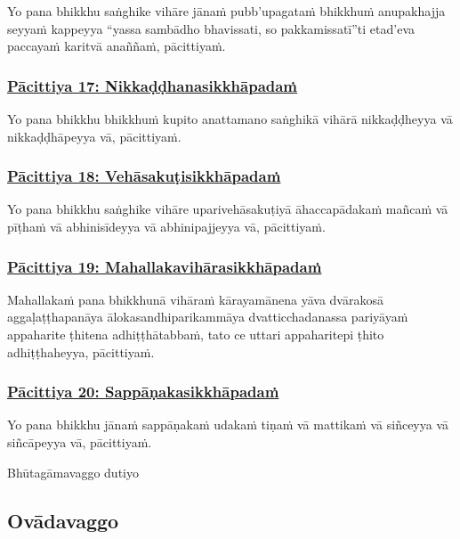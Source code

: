 Yo pana bhikkhu saṅghike vihāre jānaṁ pubb'upagataṁ bhikkhuṁ anupakhajja seyyaṁ kappeyya “yassa sambādho bhavissati, so pakkamissatī”ti etad'eva paccayaṁ karitvā anaññaṁ, pācittiyaṁ.

\subsubsection*{\hyperref[exp17]{Pācittiya 17: Nikkaḍḍhanasikkhāpadaṁ}}
\label{pac17}

Yo pana bhikkhu bhikkhuṁ kupito anattamano saṅghikā vihārā nikkaḍḍheyya vā nikkaḍḍhāpeyya vā, pācittiyaṁ.

\subsubsection*{\hyperref[exp18]{Pācittiya 18: Vehāsakuṭisikkhāpadaṁ}}
\label{pac18}

Yo pana bhikkhu saṅghike vihāre uparivehāsakuṭiyā āhaccapādakaṁ mañcaṁ vā pīṭhaṁ vā abhinisīdeyya vā abhinipajjeyya vā, pācittiyaṁ.

\subsubsection*{\hyperref[exp19]{Pācittiya 19: Mahallakavihārasikkhāpadaṁ}}
\label{pac19}

Mahallakaṁ pana bhikkhunā vihāraṁ kārayamānena yāva dvārakosā aggaḷaṭṭhapanāya ālokasandhiparikammāya dvatticchadanassa pariyāyaṁ appaharite ṭhitena adhiṭṭhātabbaṁ, tato ce uttari appaharitepi ṭhito adhiṭṭhaheyya, pācittiyaṁ.

\subsubsection*{\hyperref[exp20]{Pācittiya 20: Sappāṇakasikkhāpadaṁ}}
\label{pac20}

Yo pana bhikkhu jānaṁ sappāṇakaṁ udakaṁ tiṇaṁ vā mattikaṁ vā siñceyya vā siñcāpeyya vā, pācittiyaṁ.

\begin{center}
  Bhūtagāmavaggo dutiyo
\end{center}

\subsection{Ovādavaggo}
\vspace{0.2cm}

